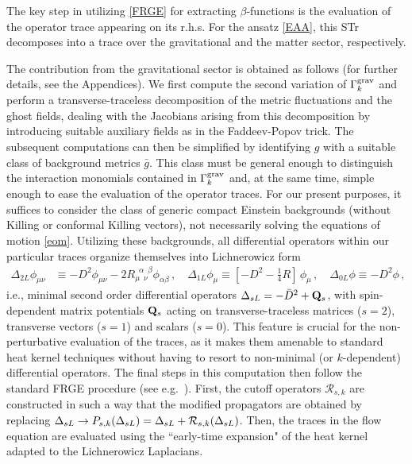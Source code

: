 \documentclass[preprint,preprintnumbers,amsmath,amssymb,nofootinbib,APS]{revtex4}
\newcommand{\be}{\begin{equation}}
\newcommand{\ee}{\end{equation}}
\newcommand{\cR}{\mathcal{R}}
\newcommand{\2}{\sqrt{2\,}}
\newcommand{\gb}{\bar{g}}
\newcommand{\Db}{\bar{D}}
\begin{document}
The key step in utilizing \eqref{FRGE} for extracting $\beta$-functions
is the evaluation of the operator trace appearing on its r.h.s. For the ansatz \eqref{EAA}, this STr decomposes into a trace over the gravitational and the matter sector, respectively. 

The contribution from the gravitational sector is obtained as follows \cite{us1} (for further details, see the Appendices). We first compute the
second variation of $\Gamma^{\rm grav}_k$ and perform a transverse-traceless decomposition of the metric fluctuations and the ghost fields, dealing with the Jacobians arising from this decomposition by introducing suitable auxiliary fields as in the Faddeev-Popov trick. The subsequent computations can then be simplified by identifying $g$ with a suitable class of background metrics $\gb$. This class must be general enough to distinguish 
the interaction monomials contained in $\Gamma^{\rm grav}_k$ and, at the same time, simple enough to ease the evaluation of the operator traces.
For our present purposes, it suffices to consider the class of generic compact Einstein backgrounds (without Killing or conformal Killing vectors), not necessarily solving the equations of motion \eqref{eom}. Utilizing these backgrounds, all differential operators within our particular traces organize themselves into Lichnerowicz form 
%
\be\label{def:LL}
\begin{split}
\Delta_{2L} \phi_{\mu\nu} & \equiv -D^2 \phi_{\mu\nu} - 2 R_{\mu\,\,\,\nu}^{\,\,\,\alpha\,\,\,\beta} \phi_{\alpha\beta}\,,\quad
\Delta_{1L} \phi_\mu  \equiv \left[ -D^2  - \tfrac{1}{4}  R \right] \,  \phi_\mu\,,\quad
\Delta_{0L} \phi  \equiv -D^2 \phi\, ,
\end{split}
\ee
%
i.e., minimal second order differential operators $\D_{sL} = - \Db^2 + {\bf Q}_{s}$, with spin-dependent matrix potentials ${\bf Q}_s$ acting on transverse-traceless matrices ($s=2$), transverse vectors ($s=1$) and scalars ($s=0$). This feature is crucial for the non-perturbative evaluation of the traces, as it makes them amenable to standard heat kernel techniques without having to resort to non-minimal (or $k$-dependent) differential operators. 
The final steps in this computation then follow the standard FRGE procedure (see e.g.\ \cite{Reuter:2007rv}). 
First, the cutoff operators $\cR_{s,k}$ are constructed in such a way that the modified propagators are obtained by replacing $\D_{sL}\to P_{s,k}(\D_{sL})=\D_{sL}+\cR_{s,k}(\D_{sL})$. Then, the traces in the flow equation are evaluated using the ``early-time expansion" of the heat kernel adapted to the Lichnerowicz Laplacians. 
\end{document}
